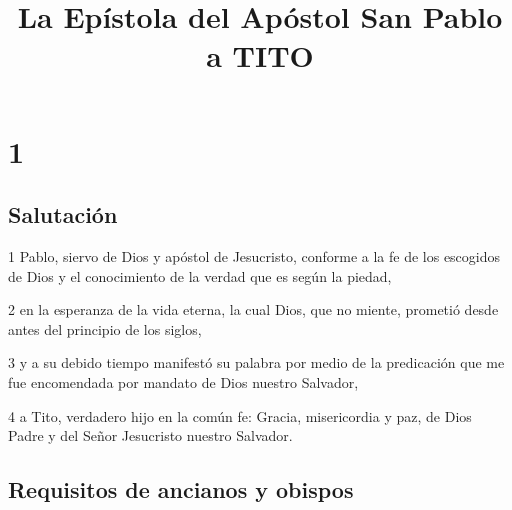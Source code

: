 
\title{La Epístola del Apóstol San Pablo a TITO}

\chapter{1}

\section*{Salutación}

\par 1 Pablo, siervo de Dios y apóstol de Jesucristo, conforme a la fe de los escogidos de Dios y el conocimiento de la verdad que es según la piedad,
\par 2 en la esperanza de la vida eterna, la cual Dios, que no miente, prometió desde antes del principio de los siglos,
\par 3 y a su debido tiempo manifestó su palabra por medio de la predicación que me fue encomendada por mandato de Dios nuestro Salvador,
\par 4 a Tito, verdadero hijo en la común fe: Gracia, misericordia y paz, de Dios Padre y del Señor Jesucristo nuestro Salvador.

\section*{Requisitos de ancianos y obispos}

